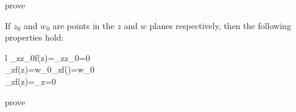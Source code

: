 \documentclass{article}
\begin{document}
\begin{IEEEproof}
prove
\end{IEEEproof}
\begin{theorem}
	If \(z_0\) and \(w_0\) are points in the \(z\) and \(w\) planes respectively, then the following properties hold:
	\begin{IEEEeqnarray*}{l}
		\lim_{z\rightarrow z_0}f(z)=\infty\Leftrightarrow\lim_{z\rightarrow z_0}=0\\
		\lim_{z\rightarrow\infty}f(z)=w_0\Leftrightarrow\lim_{z}f()=w_0\\
		\lim_{z\rightarrow\infty}f(z)=\infty\Leftrightarrow\lim_{z}=0
	\end{IEEEeqnarray*}
\end{theorem}
\begin{IEEEproof}
	prove
\end{IEEEproof}
\end{document}
